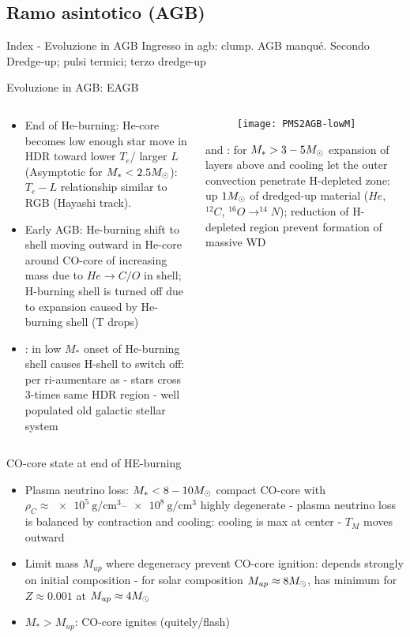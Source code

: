 \subsection{Ramo asintotico (AGB)}

\begin{frame}{Index - Evoluzione in AGB}
Ingresso in agb: clump. AGB manqu\'e. Secondo Dredge-up; pulsi termici; terzo dredge-up
\end{frame}

\begin{frame}{Evoluzione in AGB: EAGB}
\begin{columns}[T]
	\begin{column}{0.55\textwidth}
	\begin{itemize}
	\item End of He-burning: He-core becomes low enough star move in HDR toward lower $T_e$/ larger $L$ (Asymptotic for $M_*<2.5M_{\odot}$): $T_e-L$ relationship similar to RGB (Hayashi track).
	\item Early AGB: He-burning shift to shell moving outward in He-core around CO-core of increasing mass due to $He\to C/O$ in shell; H-burning shell is turned off due to expansion caused by He-burning shell (T drops)
	\item {}: in low $M_*$ onset of He-burning shell causes H-shell to switch off:  per ri-aumentare as  - stars cross 3-times same HDR region - well populated old galactic stellar system
	\end{itemize}
	\end{column}
	\begin{column}{0.45\textwidth}
	\begin{figure}[!ht]
	\texttt{[image: PMS2AGB-lowM]}\label{fig:PMS2AGB-lowM}
	\end{figure}
 and : for $M_*>3-5M_{\odot}$ expansion of layers above and cooling let the outer convection penetrate H-depleted zone: up $1M_{\odot}$ of dredged-up material ($He$, $^{12}C$, $^{16}O\to^{14}N$); reduction of H-depleted region prevent formation of massive WD
\end{column}\end{columns}
\end{frame}

\begin{frame}{CO-core state at end of HE-burning}
\begin{itemize}
\item Plasma neutrino loss: $M_*<8-10M_{\odot}$ compact CO-core with $\rho_C\approx\SIrange{e5}{e8}{\gram\per\cubic\cm}$ highly degenerate - plasma neutrino loss is balanced by contraction and cooling: cooling is max at center - $T_M$ moves outward
\item Limit mass $M_{up}$ where \Pelectron degeneracy prevent CO-core ignition: depends strongly on initial composition - for solar composition $M_{up}\approx8M_{\odot}$, has minimum for $Z\approx0.001$ at $M_{up}\approx4M_{\odot}$
\item $M_*>M_{up}$: CO-core ignites (quitely/flash)
\end{itemize}
\end{frame}

